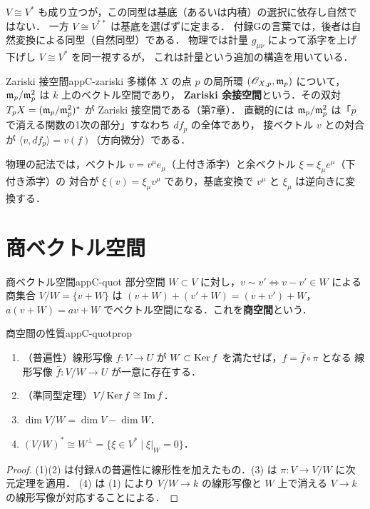 \begin{note}
$V\cong V^*$ も成り立つが，この同型は基底（あるいは内積）の選択に依存し自然ではない．
一方 $V\cong V^{**}$ は基底を選ばずに定まる．
付録Gの言葉では，後者は自然変換による同型（自然同型）である．
物理では計量 $g_{\mu\nu}$ によって添字を上げ下げし $V\cong V^*$ を同一視するが，
これは計量という追加の構造を用いている．
\end{note}

\begin{myex}{Zariski 接空間}{appC-zariski}
多様体 $X$ の点 $p$ の局所環 $(\mathscr{O}_{X,p},\mathfrak{m}_p)$ について，$\mathfrak{m}_p/\mathfrak{m}_p^2$ は $k$ 上のベクトル空間であり，
\textbf{Zariski 余接空間}という．その双対 $T_pX=(\mathfrak{m}_p/\mathfrak{m}_p^2)^*$ が Zariski 接空間である（第7章）．
直観的には $\mathfrak{m}_p/\mathfrak{m}_p^2$ は「$p$ で消える関数の1次の部分」すなわち $df_p$ の全体であり，
接ベクトル $v$ との対合が $\langle v,df_p\rangle=v(f)$（方向微分）である．
\end{myex}

物理の記法では，ベクトル $v=v^\mu e_\mu$（上付き添字）と余ベクトル $\xi=\xi_\mu e^\mu$（下付き添字）の
対合が $\xi(v)=\xi_\mu v^\mu$ であり，基底変換で $v^\mu$ と $\xi_\mu$ は逆向きに変換する．

\section{商ベクトル空間}

\begin{mydef}{商ベクトル空間}{appC-quot}
部分空間 $W\subset V$ に対し，$v\sim v'\iff v-v'\in W$ による商集合 $V/W=\{v+W\}$ は
$(v+W)+(v'+W)=(v+v')+W$，$a(v+W)=av+W$ でベクトル空間になる．これを\textbf{商空間}という．
\end{mydef}

\begin{myprop}{商空間の性質}{appC-quotprop}
\begin{enumerate}
\item（普遍性）線形写像 $f\colon V\to U$ が $W\subset\operatorname{Ker} f$ を満たせば，$f=\bar f\circ\pi$ となる
線形写像 $\bar f\colon V/W\to U$ が一意に存在する．
\item（準同型定理）$V/\operatorname{Ker} f\cong\operatorname{Im} f$．
\item $\dim V/W=\dim V-\dim W$．
\item $(V/W)^*\cong W^\perp=\{\xi\in V^*\mid\xi|_W=0\}$．
\end{enumerate}
\end{myprop}
\begin{proof}
(1)(2) は付録Aの普遍性に線形性を加えたもの．(3) は $\pi\colon V\to V/W$ に次元定理を適用．
(4) は (1) により $V/W\to k$ の線形写像と $W$ 上で消える $V\to k$ の線形写像が対応することによる．
\end{proof}

